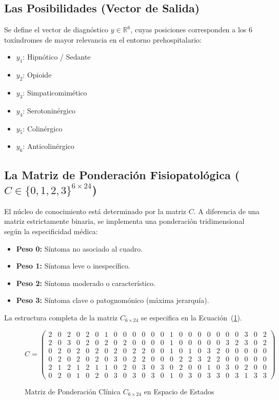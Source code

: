 \documentclass[conference,10pt,a4paper]{IEEEtran}
\begin{document}
\subsection{Las Posibilidades (Vector de Salida)}
Se define el vector de diagnóstico $y \in \mathbb{R}^6$, cuyas posiciones corresponden a los $6$ toxíndromes de mayor relevancia en el entorno prehospitalario:
\begin{itemize}
    \item $y_1$: Hipnótico / Sedante
    \item $y_2$: Opioide
    \item $y_3$: Simpaticomimético
    \item $y_4$: Serotoninérgico
    \item $y_5$: Colinérgico
    \item $y_6$: Anticolinérgico
\end{itemize}

\subsection{La Matriz de Ponderación Fisiopatológica ($C \in \{0,1,2,3\}^{6 \times 24}$)}
El núcleo de conocimiento está determinado por la matriz $C$. A diferencia de una matriz estrictamente binaria, se implementa una ponderación tridimensional según la especificidad médica:
\begin{itemize}
    \item \textbf{Peso 0:} Síntoma no asociado al cuadro.
    \item \textbf{Peso 1:} Síntoma leve o inespecífico.
    \item \textbf{Peso 2:} Síntoma moderado o característico.
    \item \textbf{Peso 3:} Síntoma clave o patognomónico (máxima jerarquía).
\end{itemize}

La estructura completa de la matriz $C_{6 \times 24}$ se especifica en la Ecuación~(\ref{eq:matrizC}).

\begin{figure}[!t]
\caption{Matriz de Ponderación Clínica $C_{6 \times 24}$ en Espacio de Estados}
\label{eq:matrizC}
\small
\begin{equation}
C = \begin{pmatrix}
2 & 0 & 2 & 0 & 2 & 0 & 1 & 0 & 0 & 0 & 0 & 0 & 0 & 1 & 0 & 0 & 0 & 0 & 0 & 0 & 0 & 3 & 0 & 2 \\
2 & 0 & 3 & 0 & 2 & 0 & 2 & 0 & 2 & 0 & 0 & 0 & 0 & 1 & 0 & 0 & 0 & 0 & 0 & 3 & 2 & 3 & 0 & 2 \\
0 & 2 & 0 & 2 & 0 & 2 & 0 & 2 & 0 & 2 & 2 & 0 & 0 & 1 & 0 & 1 & 0 & 3 & 2 & 0 & 0 & 0 & 0 & 0 \\
0 & 2 & 0 & 2 & 0 & 2 & 0 & 3 & 0 & 2 & 2 & 0 & 0 & 0 & 2 & 2 & 3 & 2 & 2 & 0 & 0 & 0 & 0 & 0 \\
2 & 1 & 2 & 1 & 2 & 1 & 1 & 0 & 2 & 0 & 3 & 0 & 3 & 0 & 2 & 0 & 0 & 1 & 0 & 3 & 0 & 2 & 0 & 0 \\
0 & 2 & 0 & 1 & 0 & 2 & 0 & 3 & 0 & 3 & 0 & 3 & 0 & 1 & 0 & 3 & 0 & 3 & 3 & 0 & 3 & 1 & 3 & 3
\end{pmatrix}
\end{equation}
\hrulefill
\end{figure}
\end{document}
